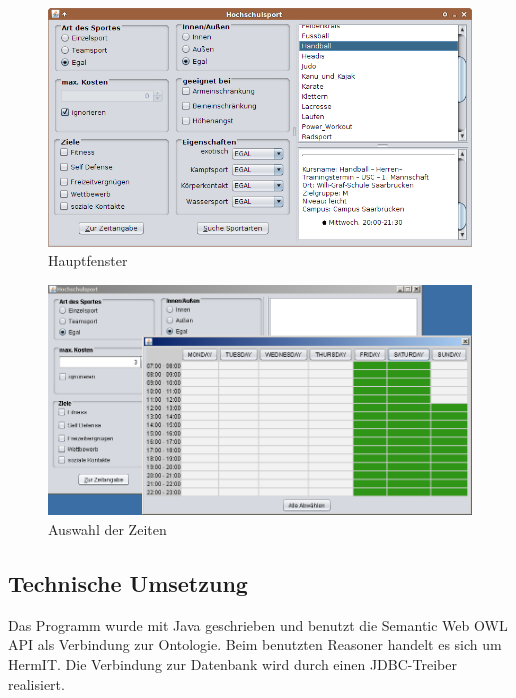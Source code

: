 

\begin{figure}[p]
\centering
\includegraphics[width=\textwidth]{images/gui2.png}%
\caption{Hauptfenster}
\label{fig:Hauptfenster}
\end{figure}

\begin{figure}[p]
\centering
\includegraphics[width=\textwidth]{images/guizeit.png}%
\caption{Auswahl der Zeiten}
\label{fig:Auswahl der Zeiten}
\end{figure}
\newpage
\subsection{Technische Umsetzung}
Das Programm wurde mit Java geschrieben und benutzt die Semantic Web OWL API \autocite{semweb:owlapi} als Verbindung zur Ontologie. Beim benutzten Reasoner handelt es sich um HermIT\autocite{krr:hermit}. Die Verbindung zur Datenbank wird durch einen JDBC-Treiber\autocite{oracle:jdbc} realisiert.

